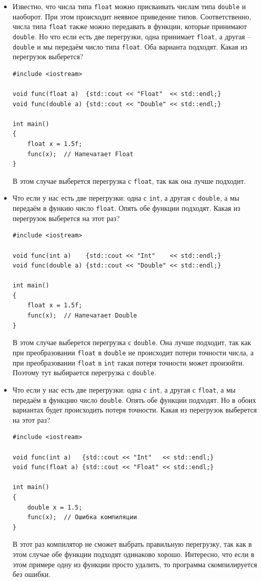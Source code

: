 \documentclass{article}
\begin{document}
\begin{itemize}
\item Известно, что числа типа \texttt{float} можно присваивать числам типа \texttt{double} и наоборот. При этом происходит неявное приведение типов. Соответственно, числа типа \texttt{float} также можно передавать в функции, которые принимают \texttt{double}. Но что если есть две перегрузки, одна принимает \texttt{float}, а другая -- \texttt{double} и мы передаём число типа \texttt{float}. Оба варианта подходят. Какая из перегрузок выберется?
\begin{lstlisting}
#include <iostream>

void func(float a)  {std::cout << "Float"  << std::endl;}
void func(double a) {std::cout << "Double" << std::endl;}

int main()
{
    float x = 1.5f;
    func(x);  // Напечатает Float
}
\end{lstlisting}
В этом случае выберется перегрузка с \texttt{float}, так как она лучше подходит.

\item Что если у нас есть две перегрузки: одна с \texttt{int}, а другая с \texttt{double}, а мы передаём в функию число \texttt{float}. Опять обе функции подходят. Какая из перегрузок выберется на этот раз?
\begin{lstlisting}
#include <iostream>

void func(int a)    {std::cout << "Int"    << std::endl;}
void func(double a) {std::cout << "Double" << std::endl;}

int main()
{
    float x = 1.5f;
    func(x);  // Напечатает Double
}
\end{lstlisting}
В этом случае выберется перегрузка с \texttt{double}. Она лучше подходит, так как при преобразовании \texttt{float} в \texttt{double} не происходит потери точности числа, а при преобразовании \texttt{float} в \texttt{int} такая потеря точности может произойти. Поэтому тут выбирается перегрузка с \texttt{double}.

\item Что если у нас есть две перегрузки: одна с \texttt{int}, а другая с \texttt{float}, а мы передаём в функцию число \texttt{double}. Опять обе функции подходят. Но в обоих вариантах будет происходить потеря точности. Какая из перегрузок выберется на этот раз?
\begin{lstlisting}
#include <iostream>

void func(int a)   {std::cout << "Int"   << std::endl;}
void func(float a) {std::cout << "Float" << std::endl;}

int main()
{
    double x = 1.5;
    func(x);  // Ошибка компиляции
}
\end{lstlisting}
В этот раз компилятор не сможет выбрать правильную перегрузку, так как в этом случае обе функции подходят одинаково хорошо. Интересно, что если в этом примере одну из функции просто удалить, то программа скомпилируется без ошибки.
\end{itemize}
\end{document}
